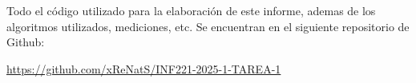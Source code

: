 Todo el código utilizado para la elaboración de este informe, ademas de los algoritmos utilizados, mediciones, etc. Se encuentran en el siguiente repositorio de Github:

\begin{mdframed}
    \begin{center}
        {\Large \url{https://github.com/xReNatS/INF221-2025-1-TAREA-1}}
    \end{center}
\end{mdframed}


